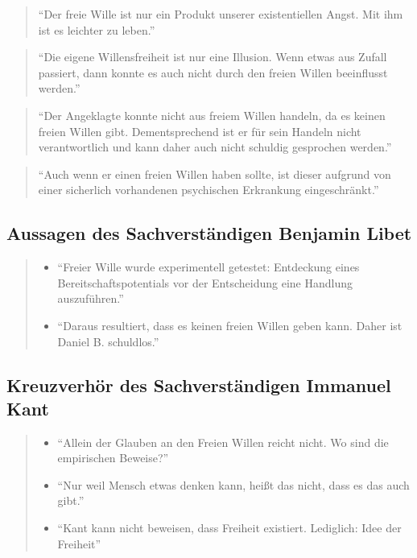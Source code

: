 \documentclass[
  a4paper,
]{report}
\begin{document}
\begin{quote}
``Der freie Wille ist nur ein Produkt unserer existentiellen Angst. Mit ihm ist es leichter zu leben.''
\end{quote}

\begin{quote}
``Die eigene Willensfreiheit ist nur eine Illusion. Wenn etwas aus Zufall passiert, dann konnte es auch nicht durch den freien Willen beeinflusst werden.''
\end{quote}

\begin{quote}
``Der Angeklagte konnte nicht aus freiem Willen handeln, da es keinen freien Willen gibt. Dementsprechend ist er für sein Handeln nicht verantwortlich und kann daher auch nicht schuldig gesprochen werden.''
\end{quote}

\begin{quote}
``Auch wenn er einen freien Willen haben sollte, ist dieser aufgrund von einer sicherlich vorhandenen psychischen Erkrankung eingeschränkt.''
\end{quote}

\hypertarget{def-expert-statement}{%
\subsection{Aussagen des Sachverständigen Benjamin Libet}\label{def-expert-statement}}

\begin{quote}
\begin{itemize}
\item
  ``Freier Wille wurde experimentell getestet: Entdeckung eines Bereitschaftspotentials vor der Entscheidung eine Handlung auszuführen.''
\item
  ``Daraus resultiert, dass es keinen freien Willen geben kann. Daher ist Daniel B. schuldlos.''
\end{itemize}
\end{quote}

\hypertarget{def-expert-cross}{%
\subsection{Kreuzverhör des Sachverständigen Immanuel Kant}\label{def-expert-cross}}

\begin{quote}
\begin{itemize}
\item
  ``Allein der Glauben an den Freien Willen reicht nicht. Wo sind die empirischen Beweise?''
\item
  ``Nur weil Mensch etwas denken kann, heißt das nicht, dass es das auch gibt.''
\item
  ``Kant kann nicht beweisen, dass Freiheit existiert. Lediglich: Idee der Freiheit''
\end{itemize}
\end{quote}
\end{document}
